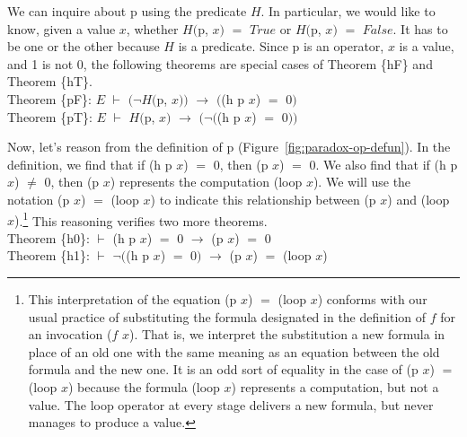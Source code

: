 We can inquire about \textsf{p} using the predicate $H$.
In particular, we would like to know, given a value $x$,
whether $H($\textsf{p}, $x)$ $=$ $True$ or $H($\textsf{p}, $x)$ $=$ $False$.
It has to be one or the other because $H$ is a predicate.
Since \textsf{p} is an operator, $x$ is a value, and \textsf{1} is not \textsf{0},
the following theorems are special cases of
Theorem \{hF\} and Theorem \{hT\}.
\vspace{2mm}\\
\hspace*{5mm}Theorem \{pF\}: $E$ $\vdash$ $(\neg H($\textsf{p}, $x))$ $\rightarrow$ $($\textsf{(h p $x$)} $=$ \textsf{0}$)$ \\
\hspace*{5mm}Theorem \{pT\}: $E$ $\vdash$ $H($\textsf{p}, $x)$ $\rightarrow$ $(\neg($\textsf{(h p $x$)} $=$ \textsf{0}$))$
\vspace{2mm}

Now, let's reason from the definition of
\textsf{p} (Figure~\ref{fig:paradox-op-defun}).
In the definition, we find that if \textsf{(h p $x$)} $=$ \textsf{0},
then \textsf{(p $x$)} $=$ \textsf{0}.
We also find that if \textsf{(h p $x$)} $\neq$ \textsf{0},
then \textsf{(p $x$)} represents
the computation \textsf{(loop $x$)}.
We will use the notation \textsf{(p $x$)} $=$ \textsf{(loop $x$)}
to indicate this relationship between \textsf{(p $x$)} and \textsf{(loop $x$)}.\footnote{This
\label{caveat:equality-for-loop}
interpretation of the equation \textsf{(p $x$)} $=$ \textsf{(loop $x$)} conforms with
our usual practice of substituting the formula designated in the
definition of $f$ for an invocation \textsf{($f$ $x$)}.
That is, we interpret the substitution a new formula
in place of an old one with the same meaning as an equation
between the old formula and the new one.
It is an odd sort of equality in the case of \textsf{(p $x$)} $=$ \textsf{(loop $x$)}
because the formula \textsf{(loop $x$)} represents a computation,
but not a value.
The \textsf{loop} operator at every stage delivers a new formula,
but never manages to produce a value.}
This reasoning verifies two more theorems.
\vspace{2mm}\\
\hspace*{5mm}Theorem \{h0\}: $\vdash$  \textsf{(h p $x$)} $=$ \textsf{0}  $\rightarrow$ \textsf{(p $x$)} $=$ \textsf{0}    \\
\hspace*{5mm}Theorem \{h1\}: $\vdash$  $\neg($\textsf{(h p $x$)} $=$ \textsf{0}$)$ $\rightarrow$ \textsf{(p $x$)} $=$ \textsf{(loop $x$)}
\vspace{2mm}

